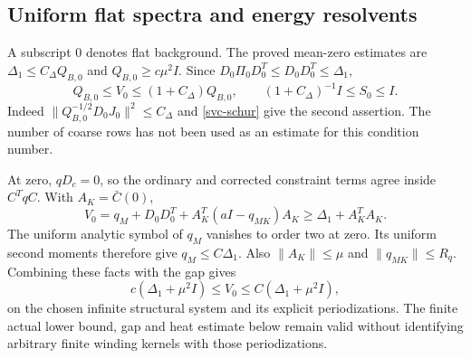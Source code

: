 \subsection{Uniform flat spectra and energy resolvents}
\label{svc-flat-section}

A subscript $0$ denotes flat background. The proved mean-zero estimates
are $\Delta_1\le C_\Delta Q_{B,0}$ and
$Q_{B,0}\ge c\mu^2I$. Since
$D_0\Pi_0D_0^T\le D_0D_0^T\le\Delta_1$,
\begin{equation}
 Q_{B,0}\le V_0\le(1+C_\Delta)Q_{B,0},\qquad
 (1+C_\Delta)^{-1}I\le S_0\le I.
 \label{svc-flat-comparison}
\end{equation}
Indeed $\|Q_{B,0}^{-1/2}D_0J_0\|^2\le C_\Delta$ and
\eqref{svc-schur} give the second assertion. The number of coarse
rows has not been used as an estimate for this condition number.

At zero, $qD_c=0$, so the ordinary and corrected constraint terms
agree inside $C^TqC$. With $A_K=\bar C(0)$,
\begin{equation}
 V_0=q_M+D_0D_0^T+A_K^T(aI-q_{MK})A_K
       \ge\Delta_1+A_K^TA_K.
 \label{svc-flat-vector}
\end{equation}
The uniform analytic symbol of $q_M$ vanishes to order two at zero.
Its uniform second moments therefore give $q_M\le C\Delta_1$.
Also $\|A_K\|\le\mu$ and $\|q_{MK}\|\le R_q$.
Combining these facts with the gap gives
\begin{equation}
 c(\Delta_1+\mu^2I)\le V_0\le C(\Delta_1+\mu^2I),
 \label{svc-energy-comparison}
\end{equation}
on the chosen infinite structural system and its explicit periodizations. The finite actual lower bound, gap and heat estimate below remain valid without identifying arbitrary finite winding kernels with those periodizations.

